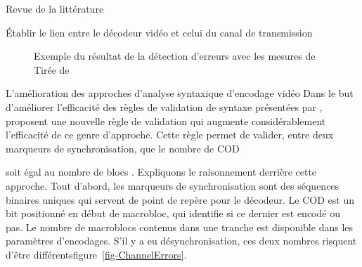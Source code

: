 \documentclass[letterpaper, twoside, 12pt,memoire]{thETS}
\newcommand{\fig}[1]{figure~\ref{#1}}
\providecommand{\DIFadd}[1]{{\protect\color{blue}\uwave{#1}}} %
\providecommand{\DIFaddbegin}{} %
\providecommand{\DIFaddend}{} %
\begin{document}
\begin{chapter}{Revue de la littérature}
\begin{section}{Établir le lien entre le décodeur vidéo et celui du canal de
transmission}
\begin{figure}
{\begin{varwidth}{\textwidth}
{\label{fig-LenaDamaged}
}
\end{varwidth}}
\caption{Exemple du résultat de la détection d'erreurs avec les mesures de \citeauthor{Ye2003}
\\Tirée de \citet[p.~371]{Ye2003}}
\label{fig-LenaYe}
\end{figure}

\end{section}

\begin{section}{L'amélioration des approches d'analyse syntaxique d'encodage
vidéo}
\label{sect-SyntaxeAnalysis}
Dans le but d'améliorer l'efficacité des règles de validation de syntaxe
présentées par \citet{Talluri1998}, \citeauthor{Yan2003} proposent une nouvelle
règle de validation qui augmente considérablement l'efficacité de ce genre
d'approche. Cette règle permet de valider, entre deux marqueurs de
synchronisation, que le nombre de COD
\DIFaddbegin 

 \DIFaddend soit égal au nombre de blocs
\citep{Yan2003}. Expliquons le raisonnement derrière cette approche. Tout
d'abord, les marqueurs de synchronisation sont des séquences binaires uniques
qui servent de point de repère pour le décodeur. Le COD est un bit positionné en
début de macrobloc, qui identifie si ce dernier est encodé ou pas. Le nombre de
macroblocs contenus dans une tranche est disponible dans les paramètres
d'encodages. S'il y a eu désynchronisation, ces deux nombres risquent d'être différents\DIFaddbegin \DIFadd{,
comme illustré à la }\fig{fig-ChannelErrors}\DIFaddend .


\end{section}
\end{chapter}
\end{document}
